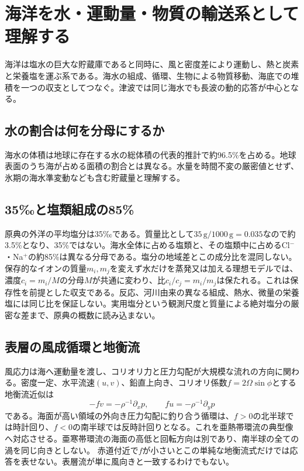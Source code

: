 \section{海洋を水・運動量・物質の輸送系として理解する}
\label{theory:ocean:overview}
海洋は塩水の巨大な貯蔵庫であると同時に、風と密度差により運動し、熱と炭素と栄養塩を運ぶ系である。海水の組成、循環、生物による物質移動、海底での堆積を一つの収支としてつなぐ。津波では同じ海水でも長波の動的応答が中心となる。

\subsection{水の割合は何を分母にするか}
\label{theory:ocean:reservoir}
海水の体積は地球に存在する水の総体積の代表的推計で約96.5\%を占める。地球表面のうち海が占める面積の割合とは異なる。水量を時間不変の厳密値とせず、氷期の海水準変動なども含む貯蔵量と理解する。\cite{usgs_ocean_water_volume}

\subsection{35‰と塩類組成の85\%}
\label{theory:ocean:salinity}
原典の外洋の平均塩分は35‰である。質量比として\(35\,\mathrm g/1000\,\mathrm g=0.035\)なので約3.5\%となり、35\%ではない。海水全体に占める塩類と、その塩類中に占めるCl\(^{-}\)・Na\(^{+}\)の約85\%は異なる分母である。塩分の地域差とこの成分比を混同しない。\cite{noaa_sea_salt}
保存的なイオンの質量\(m_i,m_j\)を変えず水だけを蒸発又は加える理想モデルでは、濃度\(c_i=m_i/M\)の分母\(M\)が共通に変わり、比\(c_i/c_j=m_i/m_j\)は保たれる。これは保存性を前提とした収支である。反応、河川由来の異なる組成、熱水、微量の栄養塩には同じ比を保証しない。実用塩分という観測尺度と質量による絶対塩分の厳密な差まで、原典の概数に読み込まない。

\subsection{表層の風成循環と地衡流}
\label{theory:ocean:gyres}
風応力は海へ運動量を渡し、コリオリ力と圧力勾配が大規模な流れの方向に関わる。密度一定、水平流速\((u,v)\)、鉛直上向き、コリオリ係数\(f=2\Omega\sin\phi\)とする地衡流近似は
\[
 -fv=-\rho^{-1}\partial_xp,\qquad
 fu=-\rho^{-1}\partial_yp
\]
である。海面が高い領域の外向き圧力勾配に釣り合う循環は、\(f>0\)の北半球では時計回り、\(f<0\)の南半球では反時計回りとなる。これを亜熱帯環流の典型像へ対応させる。亜寒帯環流の海面の高低と回転方向は別であり、南半球の全ての渦を同じ向きとしない。\cite{noaa_subtropical_ecco}
赤道付近で\(f\)が小さいとこの単純な地衡流式だけでは応答を表せない。表層流が単に風向きと一致するわけでもない。

